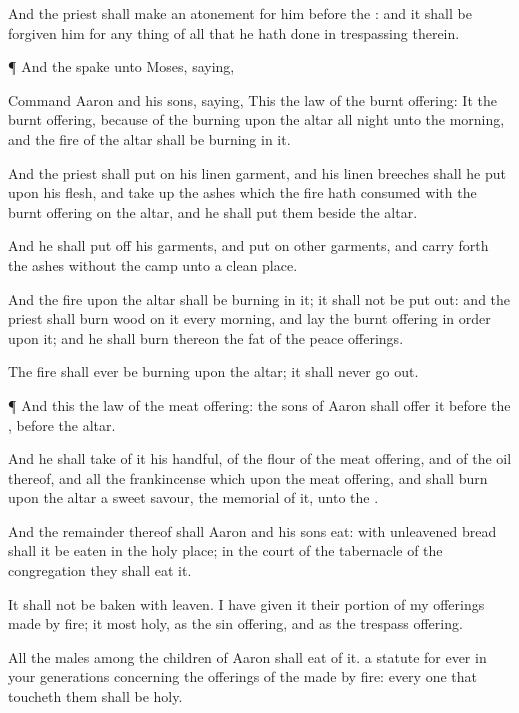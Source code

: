 {And the
priest shall make an
atonement for him
before the
{}: and it shall be
forgiven him for any
thing of all that he hath
done in
trespassing therein.


\par }{\PP {}¶ And the
{}
spake unto
Moses,
saying,

Command
Aaron and his
sons,
saying, This
{} the
law of the burnt
offering: It
{} the burnt
offering, because of the
burning upon the
altar all
night unto the
morning, and the
fire of the
altar shall be
burning in it.

And the
priest shall
put on his
linen
garment, and his
linen
breeches shall he
put upon his
flesh, and take
up the
ashes which the
fire hath
consumed with the burnt
offering on the
altar, and he shall
put them
beside the
altar.

And he shall put
off his
garments, and put
on
other
garments, and carry
forth the
ashes
without the
camp unto a
clean
place.

And the
fire upon the
altar shall be
burning in it; it shall not be put
out: and the
priest shall
burn
wood on it every
morning, and lay the burnt
offering in
order upon it; and he shall
burn thereon the
fat of the peace
offerings.

The
fire shall
ever be
burning upon the
altar; it shall never go
out.


\par }{\PP {}¶ And this
{} the
law of the meat
offering: the
sons of
Aaron shall
offer it
before the
{},
before the
altar.

And he shall
take of it his
handful, of the
flour of the meat
offering, and of the
oil thereof, and all the
frankincense which
{} upon the meat
offering, and shall
burn
{} upon the
altar
{} a
sweet
savour,
{} the
memorial of it, unto the
{}.

And the
remainder thereof shall
Aaron and his
sons
eat: with unleavened
bread shall it be
eaten in the
holy
place; in the
court of the
tabernacle of the
congregation they shall
eat it.

It shall not be
baken with
leaven. I have
given it
{} their
portion of my offerings made by
fire; it
{}
most
holy, as
{} the sin
offering, and as the trespass
offering.

All the
males among the
children of
Aaron shall
eat of it.
{} a
statute for
ever in your
generations concerning the
offerings of the
{} made by
fire: every one that
toucheth them shall be
holy.


}
